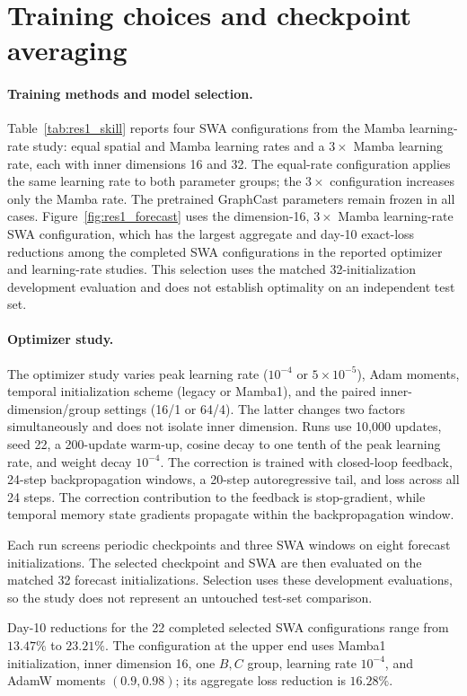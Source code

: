 \documentclass{article}
\begin{document}
\section{Training choices and checkpoint averaging}
\label{app:training}
\paragraph{Training methods and model selection.}
Table~\ref{tab:res1_skill} reports four SWA configurations from the Mamba learning-rate study: equal spatial and Mamba learning rates and a $3\times$ Mamba learning rate, each with inner dimensions 16 and 32. The equal-rate configuration applies the same learning rate to both parameter groups; the $3\times$ configuration increases only the Mamba rate. The pretrained GraphCast parameters remain frozen in all cases. Figure~\ref{fig:res1_forecast} uses the dimension-16, $3\times$ Mamba learning-rate SWA configuration, which has the largest aggregate and day-10 exact-loss reductions among the completed SWA configurations in the reported optimizer and learning-rate studies. This selection uses the matched 32-initialization development evaluation and does not establish optimality on an independent test set.

\paragraph{Optimizer study.}
The optimizer study varies peak learning rate ($10^{-4}$ or $5\times10^{-5}$), Adam moments, temporal initialization scheme (legacy or Mamba1), and the paired inner-dimension/group settings (16/1 or 64/4). The latter changes two factors simultaneously and does not isolate inner dimension. Runs use 10,000 updates, seed 22, a 200-update warm-up, cosine decay to one tenth of the peak learning rate, and weight decay $10^{-4}$. The correction is trained with closed-loop feedback, 24-step backpropagation windows, a 20-step autoregressive tail, and loss across all 24 steps. The correction contribution to the feedback is stop-gradient, while temporal memory state gradients propagate within the backpropagation window.

Each run screens periodic checkpoints and three SWA windows on eight forecast initializations. The selected checkpoint and SWA are then evaluated on the matched 32 forecast initializations. Selection uses these development evaluations, so the study does not represent an untouched test-set comparison.

Day-10 reductions for the 22 completed selected SWA configurations range from $13.47\%$ to $23.21\%$. The configuration at the upper end uses Mamba1 initialization, inner dimension 16, one $B,C$ group, learning rate $10^{-4}$, and AdamW moments $(0.9,0.98)$; its aggregate loss reduction is $16.28\%$.
\end{document}
